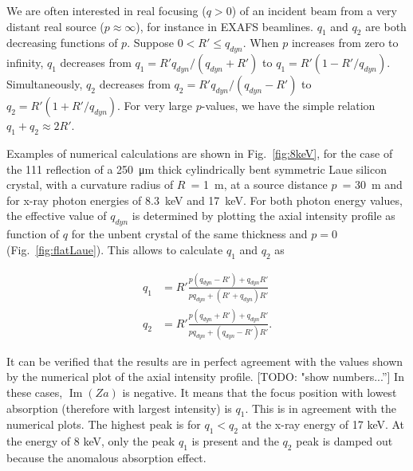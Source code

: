 \documentclass[preprint]{iucr}              %
\newcommand{\todo}[1]{{\color{red}[TODO: "#1'']}}
\begin{document}
We are often interested in real focusing ($q>0$) of an incident beam from a very distant real source ($p\approx \infty$), for instance in EXAFS beamlines. $q_1$ and $q_2$ are both decreasing functions of $p$. Suppose $0<R'\le q_{dyn}$. When $p$ increases from zero to infinity, $q_1$ decreases from $q_1=R'q_{dyn}/(q_{dyn}+R')$ to $q_1=R'(1-R'/q_{dyn})$. Simultaneously, $q_2$ decreases from $q_2=R'q_{dyn}/(q_{dyn}-R')$ to $q_2=R'(1+R'/q_{dyn})$. For very large $p$-values, we have the simple relation $q_1+q_2\approx 2R'$.

Examples of numerical calculations are shown in Fig.~\ref{fig:8keV}, for the case of the 111 reflection of a \SI{250}{\micro\meter} thick cylindrically bent symmetric Laue silicon crystal, with a curvature radius of $R$~= \SI{1}{\meter}, at a source distance $p$~= \SI{30}{\meter} and for x-ray photon energies of 8.3~keV and 17~keV. 
For both photon energy values, the effective value of $q_{dyn}$ is determined by plotting the axial intensity profile as function of $q$ for the unbent crystal of the same thickness and $p=0$ (Fig.~\ref{fig:flatLaue}). This allows to calculate $q_1$ and $q_2$ as


\begin{align}
\label{eq:q1andq2}
    q_1 &= R' \frac{p(q_{dyn}-R')+q_{dyn}R'}{p q_{dyn}+(R'+q_{dyn})R'} \\
    q_2 &= R' \frac{p(q_{dyn}+R')+q_{dyn}R'}{p q_{dyn}+(q_{dyn}-R')R'}.
\end{align}

It can be verified that the results are in perfect agreement with the values shown by the numerical plot of the axial intensity profile. \todo{show numbers...}
In these cases,
$\operatorname{Im}(Za)$ is negative. It means that the focus position with lowest absorption (therefore with largest intensity) is $q_1$. This is in agreement with the numerical plots. 
The highest peak is for $q_1<q_2$ at the x-ray energy of 17 keV. At the energy of 8 keV, only the  peak $q_1$ is present and the $q_2$ peak is damped out because the anomalous absorption effect.
\end{document}
